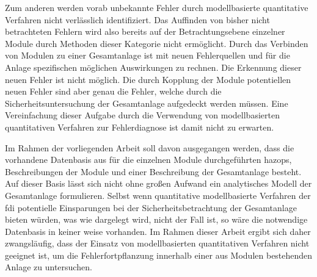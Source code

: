Zum anderen werden vorab unbekannte Fehler durch modellbasierte quantitative Verfahren nicht verl\"asslich identifiziert. Das Auffinden von bisher nicht betrachteten Fehlern wird also bereits auf der Betrachtungsebene einzelner Module durch Methoden dieser Kategorie nicht erm\"oglicht. Durch das Verbinden von Modulen zu einer Gesamtanlage ist mit neuen Fehlerquellen und f\"ur die Anlage spezifischen m\"oglichen Auswirkungen zu rechnen. Die Erkennung dieser neuen Fehler ist nicht m\"oglich. Die durch Kopplung der Module potentiellen neuen Fehler sind aber genau die Fehler, welche durch die Sicherheitsuntersuchung der Gesamtanlage aufgedeckt werden m\"ussen. Eine Vereinfachung dieser Aufgabe durch die Verwendung von modellbasierten quantitativen Verfahren zur Fehlerdiagnose ist damit nicht zu erwarten. \newline

Im Rahmen der vorliegenden Arbeit soll davon ausgegangen werden, dass die vorhandene Datenbasis aus f\"ur die einzelnen Module durchgef\"uhrten \acp{hazop}, Beschreibungen der Module und einer Beschreibung der Gesamtanlage besteht. Auf dieser Basis l\"asst sich nicht ohne gro\ss{}en Aufwand ein analytisches Modell der Gesamtanlage formulieren. Selbst wenn quantitative modellbasierte Verfahren der \ac{fdi} potentielle Einsparungen bei der Sicherheitsbetrachtung der Gesamtanlage bieten w\"urden, was wie dargelegt wird, nicht der Fall ist, so w\"are die notwendige Datenbasis in keiner weise vorhanden. Im Rahmen dieser Arbeit ergibt sich daher  zwangsl\"aufig, dass der Einsatz von modellbasierten quantitativen Verfahren nicht geeignet ist, um die Fehlerfortpflanzung innerhalb einer aus Modulen bestehenden Anlage zu untersuchen. 
